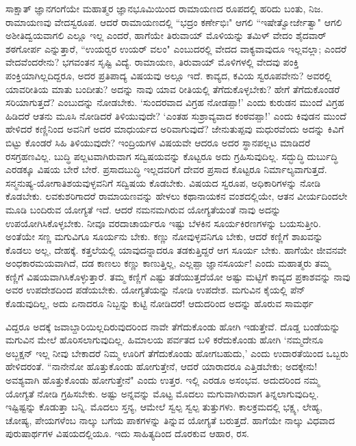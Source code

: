 ಸಾಕ್ಷಾತ್‍ ಜ್ಞಾನಗಂಗೆಯೇ ಮಹಾತ್ಮರ ಜ್ಞಾನಭೂಮಿಯಿಂದ ರಾಮಾಯಣದ ರೂಪದಲ್ಲಿ ಹರಿದು ಬಂತು, ನಿಜ. ರಾಮಾಯಣವು ವೇದಸ್ವರೂಪ. ಆದರೆ ರಾಮಾಯಣದಲ್ಲಿ ``ಭದ್ರಂ ಕರ್ಣೇಭಿಃ" ಆಗಲಿ ``ಇಷೇತ್ವೋರ್ಜೇತ್ವಾ" ಆಗಲಿ ಅಶೀತಿದ್ವಯವಾಗಲಿ ಎಲ್ಲೂ ಇಲ್ಲ ಎಂದರೆ, ಹಾಗೆಯೇ ತಿರುವಾಯ್‍ ಮೊಳಿಯನ್ನು ತಮಿಳ್‍ ವೇದಂ ಶೈದವಾರ್‍ ಶಠಗೋರ್ಪ ಎನ್ನುತ್ತಾರೆ, ``ಉಯರ್‍ವರ ಉಯರ್‍ ವಲಂ" ಎಂಬುದರಲ್ಲಿ ವೇದದ ವಾಕ್ಯವಾವುದೂ ಇಲ್ಲವಲ್ಲಾ; ಎಂದರೆ ವೇದವೆಂದರೇನು? ಭಗವಂತನ ಸೃಷ್ಟಿ ವಿದ್ಯೆ. ರಾಮಾಯಣ, ತಿರುವಾಯ್‍ ಮೊಳಿಗಳಲ್ಲಿ ವೇದವು ಪಂಕ್ತಿ ಪಂಕ್ತಿಯಾಗಿಲ್ಲದಿದ್ದರೂ, ಅದರ ಪ್ರತಿಪಾದ್ಯ ವಿಷಯವು ಅಲ್ಲೂ ಇದೆ. ಕಾವ್ಯದ, ಕವಿಯ ಸ್ವರೂಪವೇನು? ಅವರಲ್ಲಿ ಯಾವರೀತಿಯ ಮಾತು ಬಂದೀತು? ಅದನ್ನು ನಾವು ಯಾವ ರೀತಿಯಲ್ಲಿ ತೆಗೆದುಕೊಳ್ಳಬೇಕು? ಹೇಗೆ ತೆಗೆದುಕೊಂಡರೆ ಸರಿಯಾಗುತ್ತದೆ? ಎಂಬುದನ್ನು ನೋಡಬೇಕು. `ಸುಂದರವಾದ ವಿಗ್ರಹ ನೋಡಪ್ಪಾ!' ಎಂದು ಕುರುಡನ ಮುಂದೆ ವಿಗ್ರಹ ಹಿಡಿದರೆ ಆತನು ಮೂಸಿ ನೋಡಿದರೆ ತಿಳಿಯುವುದೇ? `ಎಂತಹ ಸುಶ್ರಾವ್ಯವಾದ ಕಂಠವಪ್ಪಾ!' ಎಂದು ಕಿವುಡನ ಮುಂದೆ ಹೇಳಿದರೆ ಕಣ್ಣಿನಿಂದ ಅವನಿಗೆ ಅದರ ಮಾಧುರ್ಯದ ಅರಿವಾಗುವುದೆ? ಜೇನುತುಪ್ಪವು ಮಧುರವೆಂದು ಅದನ್ನು ಕಿವಿಗೆ ಬಿಟ್ಟು ಕೊಂಡರೆ ಸಿಹಿ ತಿಳಿಯುವುದೇ? ಇಂದ್ರಿಯಗಳ ವಿಷಯವೇ ಆದರೂ ಅದರ ಸ್ಥಾನಪಲ್ಲಟ ಮಾಡಿದರೆ ರಸಗ್ರಹಣವಿಲ್ಲ. ಬುದ್ಧಿ ಪಲ್ಲಟವಾಗಿರುವಾಗ ಸದ್ವಿಷಯವನ್ನು ಕೊಟ್ಟರೂ ಅದು ಗ್ರಹಿಸುವುದಿಲ್ಲ. ಸದ್ಭುದ್ಧಿ ದುರ್ಬುದ್ಧಿ ಎರಡಕ್ಕೂ ವಿಷಯ ಬೇರೆ ಬೇರೆ. ಪ್ರಸಾದಬುದ್ಧಿ ಇಲ್ಲದವರಿಗೆ ದೇವರ ಪ್ರಸಾದ ಕೊಟ್ಟರೂ ನಿರ್ಮಾಲ್ಯವಾಗುತ್ತದೆ. ಸನ್ಮನುಷ್ಯ-ಯೋಗಾತಿಶಯವುಳ್ಳವನಿಗೆ ಸದ್ವಿಷಯ ಕೊಡಬೇಕು. ವಿಷಯದ ಸ್ವರೂಪ, ಅಧಿಕಾರಿಗಳನ್ನು ನೋಡಿ ಕೊಡಬೇಕು. ಲವಕುಶರಿಗಾದರೆ ರಾಮಾಯಣವನ್ನು ಹೇಳಲು ಕಥಾನಾಯಕನ ವಂಶದಲ್ಲಿಯೇ, ಆತನ ವೀರ್ಯದಿಂದಲೇ ಮೂಡಿ ಬಂದಿರುವ ಯೋಗ್ಯತೆ ಇದೆ. ಆದರೆ ನಮನಮಗಿರುವ ಯೋಗ್ಯತೆಯಂತೆ ನಾವು ಅದನ್ನು ಉಪಯೋಗಿಸಿಕೊಳ್ಳಬೇಕು. ನೀವೂ ವರದಾಚಾರ್ಯರೂ ಇಷ್ಟು ಬೆಳಕಿನ ಸೂರ್ಯಕಿರಣಗಳನ್ನು ಬಯಸುತ್ತೀರಿ. ಅಂತೆಯೇ ಸಣ್ಣ ಮಗುವಿಗೂ ಸೂರ್ಯನು ಬೇಕು. ಕಣ್ಣು ನೋವುಳ್ಳವನಿಗೂ ಬೇಕು, ಆದರೆ ಕಣ್ಣಿಗೆ ಶಾಖವನ್ನು ಕೊಡಲು ಅಲ್ಲ, ದೇಹಕ್ಕೆ. ಕತ್ತಲೆಯಲ್ಲಿ ಯಾವುದನ್ನಾದರೂ ತಡಕುತ್ತಿದ್ದರೆ ಆಗ ಸೂರ್ಯ ಬೇಕು. ಹಾಗೆಯೇ ಜೀವನವೇ ಅಂಧಕಾರಮಯವಾಗಿದೆ, ದಡ ಕಾಣಲು ಕಣ್ಣು ಕಾಣುತ್ತಿಲ್ಲ, ಎಲ್ಲಪ್ಪಾ ಜ್ಞಾನಸೂರ್ಯ! ಎಂದು ಮಹಾತ್ಮರು ತಮ್ಮ ಕಣ್ಣಿಗೆ ವಿಷಯವಾಗಿಸಿಕೊಳ್ಳುತ್ತಾರೆ. ತಮ್ಮ ಕಣ್ಣಿಗೆ ಎಷ್ಟು ತಡೆಯುತ್ತದೆಯೋ ಅಷ್ಟು ಮಟ್ಟಿಗೆ ಕಾವ್ಯದ ಪ್ರಕಾಶವನ್ನು ನಾವು ಅವರ ಉಪದೇಶದಿಂದ ಪಡೆಯಬೇಕು. ಯೋಗ್ಯತೆಯನ್ನು ನೋಡಿ ಉಪದೇಶ. ಮಗುವಿನ ಕೈಯಲ್ಲಿ ಪೆನ್‍ ಕೊಡುವುದಿಲ್ಲ, ಅದು ಏನಾದರೂ ನಿಬ್ಬನ್ನು ಕುಟ್ಟಿ ನೋಡಿದರೆ! ಆದುದರಿಂದ ಅದನ್ನು ಹೊರುವ ಸಾಮರ್ಥ


ವಿದ್ದರೂ ಅದಕ್ಕೆ ಜವಾಬ್ದಾರಿಯಿಲ್ಲದಿರುವುದರಿಂದ ನಾವೇ ತೆಗೆದುಕೊಂಡು ಹೋಗಿ ಇಡುತ್ತೇವೆ. ದೊಡ್ಡ ಬಂಡೆಯನ್ನು ಮಗುವಿನ ಮೇಲೆ ಹೊರಿಸಲಾಗುವುದಿಲ್ಲ. ಹಿಮಾಲಯ ಪರ್ವತದ ಬಳಿ ಕರೆದುಕೊಂಡು ಹೋಗಿ `ನಮ್ಮದೇನೂ ಅಬ್ಜಕ್ಷನ್‍ {} ಇಲ್ಲ ನೀವು ಬೇಕಾದರೆ ನಿಮ್ಮ ಊರಿಗೆ ತೆಗೆದುಕೊಂಡು ಹೋಗಬಹುದು,' ಎಂದು ಉದಾರತೆಯಿಂದ ಒಬ್ಬರು ಹೇಳಿದರಂತೆ. ``ನಾನೇನೋ ಹೊತ್ತುಕೊಂಡು ಹೋಗುತ್ತೇನೆ, ಆದರೆ ಯಾರಾದರೂ ಎತ್ತಿಡಬೇಕು; ಅದಕ್ಕೇನು! ಅವಶ್ಯವಾಗಿ ಹೊತ್ತುಕೊಂಡು ಹೋಗುತ್ತೇನೆ" ಎಂದು ಉತ್ತರ. ಇಲ್ಲಿ ಎರಡೂ ಅಸಂಭವ. ಅದುದರಿಂದ ನಮ್ಮ ಯೋಗ್ಯತೆ ನೋಡಿ ಗ್ರಹಿಸಬೇಕು. ಅಷ್ಟು ಅನ್ನವನ್ನು ಮೊಟ್ಟ ಮೊದಲು ಮಗುವಾಗಿರುವಾಗ ತಿನ್ನಲಾಗುವುದಿಲ್ಲ. ಇಷ್ಟಿಷ್ಟನ್ನು ಕೊಡುತ್ತಾ ಬನ್ನಿ. ಮೊದಲು ಸ್ತನ್ಯ, ಆಮೇಲೆ ಸ್ವಲ್ಪ ಸ್ವಲ್ಪ ತುತ್ತುಗಳು. ಕಾಲಕ್ರಮದಲ್ಲಿ ಭಕ್ಷ್ಯ, ಲೇಹ್ಯ, ಚೋಷ್ಯ, ಪೇಯಗಳೆಂಬ ನಾಲ್ಕು ಬಗೆಯ ಪಾಕಗಳನ್ನು ತಿನ್ನುವ ಯೋಗ್ಯತೆ ಬರುತ್ತದೆ. ಹಾಗೆಯೇ ನಾಲ್ಕು ವಿಧವಾದ ಪುರುಷಾರ್ಥಗಳ ವಿಷಯದಲ್ಲಿಯೂ. ಇದು ಸಾಹಿತ್ಯದಿಂದ ದೊರಕುವ ಆಹಾರ, ರಸ. 



